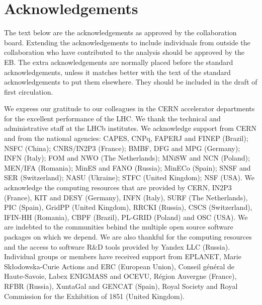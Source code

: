\section*{Acknowledgements}

The text below are the acknowledgements as approved by the collaboration
board. Extending the acknowledgements to include individuals from outside the
collaboration who have contributed to the analysis should be approved by the
EB. The extra acknowledgements are normally placed before the standard 
acknowledgements, unless it matches better with the text of the standard 
acknowledgements to put them elsewhere.
They should be included in the draft of first circulation.
 
\noindent We express our gratitude to our colleagues in the CERN
accelerator departments for the excellent performance of the LHC. We
thank the technical and administrative staff at the LHCb
institutes. We acknowledge support from CERN and from the national
agencies: CAPES, CNPq, FAPERJ and FINEP (Brazil); NSFC (China);
CNRS/IN2P3 (France); BMBF, DFG and MPG (Germany); INFN (Italy); 
FOM and NWO (The Netherlands); MNiSW and NCN (Poland); MEN/IFA (Romania); 
MinES and FANO (Russia); MinECo (Spain); SNSF and SER (Switzerland); 
NASU (Ukraine); STFC (United Kingdom); NSF (USA).
We acknowledge the computing resources that are provided by CERN, IN2P3 (France), KIT and DESY (Germany), INFN (Italy), SURF (The Netherlands), PIC (Spain), GridPP (United Kingdom), RRCKI (Russia), CSCS (Switzerland), IFIN-HH (Romania), CBPF (Brazil), PL-GRID (Poland) and OSC (USA). We are indebted to the communities behind the multiple open 
source software packages on which we depend. We are also thankful for the 
computing resources and the access to software R\&D tools provided by Yandex LLC (Russia).
Individual groups or members have received support from 
EPLANET, Marie Sk\l{}odowska-Curie Actions and ERC (European Union), 
Conseil g\'{e}n\'{e}ral de Haute-Savoie, Labex ENIGMASS and OCEVU, 
R\'{e}gion Auvergne (France), RFBR (Russia), XuntaGal and GENCAT (Spain), Royal Society and Royal
Commission for the Exhibition of 1851 (United Kingdom).
